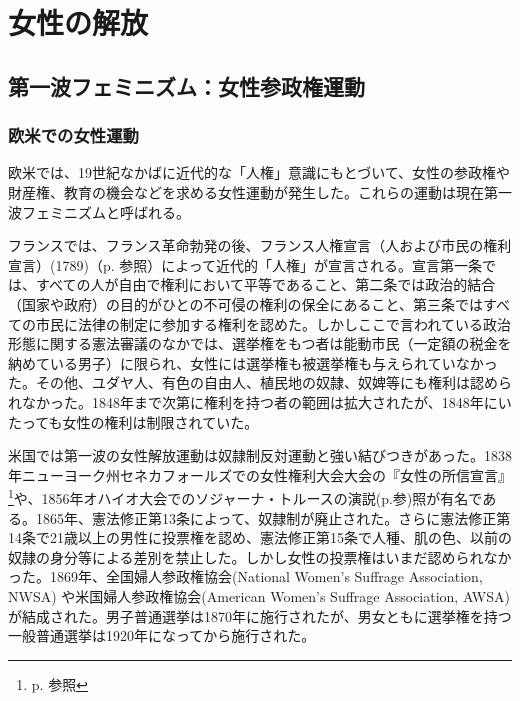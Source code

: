 \documentclass[dvipdfmx,uplatex]{jsarticle}
\author{江口聡}
\title{}
\begin{document}
\maketitle
\else\chapter{女性の解放}\fi

\section{第一波フェミニズム：女性参政権運動}


\subsection{欧米での女性運動}

欧米では、19世紀なかばに近代的な「人権」意識にもとづいて、女性の参政権や財産権、教育の機会などを求める女性運動が発生した。これらの運動は現在第一波フェミニズムと呼ばれる。

フランスでは、フランス革命勃発の後、フランス人権宣言（人および市民の権利宣言）(1789)（p. \pageref{french}参照）によって近代的「人権」が宣言される。宣言第一条では、すべての人が自由で権利において平等であること、第二条では政治的結合（国家や政府）の目的がひとの不可侵の権利の保全にあること、第三条ではすべての市民に法律の制定に参加する権利を認めた。しかしここで言われている政治形態に関する憲法審議のなかでは、選挙権をもつ者は能動市民（一定額の税金を納めている男子）に限られ、女性には選挙権も被選挙権も与えられていなかった。その他、ユダヤ人、有色の自由人、植民地の奴隷、奴婢等にも権利は認められなかった。1848年まで次第に権利を持つ者の範囲は拡大されたが、1848年にいたっても女性の権利は制限されていた。

米国では第一波の女性解放運動は奴隷制反対運動と強い結びつきがあった。1838年ニューヨーク州セネカフォールズでの女性権利大会大会の『女性の所信宣言』\footnote{p. \pageref{sentiment}参照}や、1856年オハイオ大会でのソジャーナ・トルースの演説(p.\pageref{truth}参)照が有名である。1865年、憲法修正第13条によって、奴隷制が廃止された。さらに憲法修正第14条で21歳以上の男性に投票権を認め、憲法修正第15条で人種、肌の色、以前の奴隷の身分等による差別を禁止した。しかし女性の投票権はいまだ認められなかった。1869年、全国婦人参政権協会(National Women's Suffrage Association, NWSA) や米国婦人参政権協会(American Women's Suffrage Association, AWSA)が結成された。男子普通選挙は1870年に施行されたが、男女ともに選挙権を持つ一般普通選挙は1920年になってから施行された。
\end{document}
